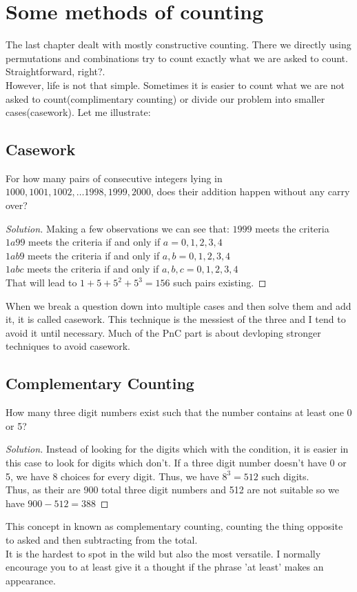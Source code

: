 \chapter{Some methods of counting}
The last chapter dealt with mostly constructive counting. There we directly using permutations and combinations try to count exactly what we are asked to count. Straightforward, right?.\\
However, life is not that simple. Sometimes it is easier to count what we are not asked to count(complimentary counting) or divide our problem into smaller cases(casework). Let me illustrate:
\section{Casework}
\begin{example}
    For how many pairs of consecutive integers lying in {$1000, 1001, 1002, \dots 1998, 1999, 2000$}, does their addition happen without any carry over?
\end{example}
\begin{proof}
    [Solution]
    Making a few observations we can see that: 
    $1999$ meets the criteria\\
    $1a99$ meets the criteria if and only if $a=0,1,2,3,4$\\
    $1ab9$ meets the criteria if and only if $a,b=0,1,2,3,4$\\
    $1abc$ meets the criteria if and only if $a,b,c=0,1,2,3,4$\\
    That will lead to $1+5+5^2+5^3=156$ such pairs existing.
\end{proof}
When we break a question down into multiple cases and then solve them and add it, it is called casework.  This technique is the messiest of the three and I tend to avoid it until necessary. Much of the PnC part is about devloping stronger techniques to avoid casework.
\section{Complementary Counting}
\begin{example}
     How many three digit numbers exist such that the number contains at least one 0 or 5?
\end{example}
\begin{proof}
    [Solution]
    Instead of looking for the digits which with the condition, it is easier in this case to look for digits which don't. If a three digit number doesn't have 0 or 5, we have 8 choices for every digit. Thus, we have $8^3=512$ such digits.\\
    Thus, as their are 900 total three digit numbers and 512 are not suitable so we have $900-512=388$
\end{proof}
This concept in known as complementary counting, counting the thing opposite to asked and then subtracting from the total. \\
It is the hardest to spot in the wild but also the most versatile. I normally encourage you to at least give it a thought if the phrase 'at least' makes an appearance.
